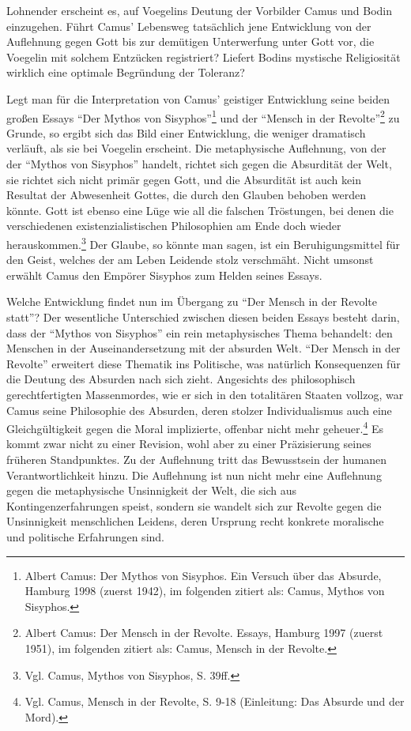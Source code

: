 Lohnender erscheint es, auf Voegelins Deutung der Vorbilder Camus und Bodin
einzugehen. Führt Camus' Lebensweg tatsächlich jene Entwicklung von der
Auflehnung gegen Gott bis zur demütigen Unterwerfung unter Gott vor, die
Voegelin mit solchem Entzücken registriert? Liefert Bodins mystische
Religiosität wirklich eine optimale Begründung der Toleranz?

Legt man für die Interpretation von Camus' geistiger Entwicklung seine beiden
großen Essays "`Der Mythos von Sisyphos"'\footnote{Albert Camus: Der Mythos
  von Sisyphos. Ein Versuch über das Absurde, Hamburg 1998 (zuerst 1942), im
  folgenden zitiert als: Camus, Mythos von Sisyphos.} und der "`Mensch in der
Revolte"'\footnote{Albert Camus: Der Mensch in der Revolte. Essays, Hamburg
  1997 (zuerst 1951), im folgenden zitiert als: Camus, Mensch in der Revolte.}
zu Grunde, so ergibt sich das Bild einer Entwicklung, die weniger dramatisch
verläuft, als sie bei Voegelin erscheint. Die metaphysische Auflehnung, von
der der "`Mythos von Sisyphos"' handelt, richtet sich gegen die Absurdität der
Welt, sie richtet sich nicht primär gegen Gott, und die Absurdität ist auch
kein Resultat der Abwesenheit Gottes, die durch den Glauben behoben werden
könnte. Gott ist ebenso eine Lüge wie all die falschen Tröstungen, bei denen
die verschiedenen existenzialistischen Philosophien am Ende doch wieder
herauskommen.\footnote{Vgl. Camus, Mythos von Sisyphos, S. 39ff.} Der Glaube,
so könnte man sagen, ist ein Beruhigungsmittel für den Geist, welches der am
Leben Leidende stolz verschmäht. Nicht umsonst erwählt Camus den Empörer
Sisyphos zum Helden seines Essays.

Welche Entwicklung findet nun im Übergang zu "`Der Mensch in der Revolte
statt"'? Der wesentliche Unterschied zwischen diesen beiden Essays besteht
darin, dass der "`Mythos von Sisyphos"' ein rein metaphysisches Thema
behandelt: den Menschen in der Auseinandersetzung mit der absurden Welt. "`Der
Mensch in der Revolte"' erweitert diese Thematik ins Politische, was natürlich
Konsequenzen für die Deutung des Absurden nach sich zieht. Angesichts des
philosophisch gerechtfertigten Massenmordes, wie er sich in den totalitären
Staaten vollzog, war Camus seine Philosophie des Absurden, deren stolzer
Individualismus auch eine Gleichgültigkeit gegen die Moral implizierte,
offenbar nicht mehr geheuer.\footnote{Vgl. Camus, Mensch in der Revolte, S.
  9-18 (Einleitung: Das Absurde und der Mord).} Es kommt zwar nicht zu einer
Revision, wohl aber zu einer Präzisierung seines früheren Standpunktes. Zu der
Auflehnung tritt das Bewusstsein der humanen Verantwortlichkeit hinzu. Die
Auflehnung ist nun nicht mehr eine Auflehnung gegen die metaphysische
Unsinnigkeit der Welt, die sich aus Kontingenzerfahrungen speist, sondern sie
wandelt sich zur Revolte gegen die Unsinnigkeit menschlichen Leidens, deren
Ursprung recht konkrete moralische und politische Erfahrungen sind.

